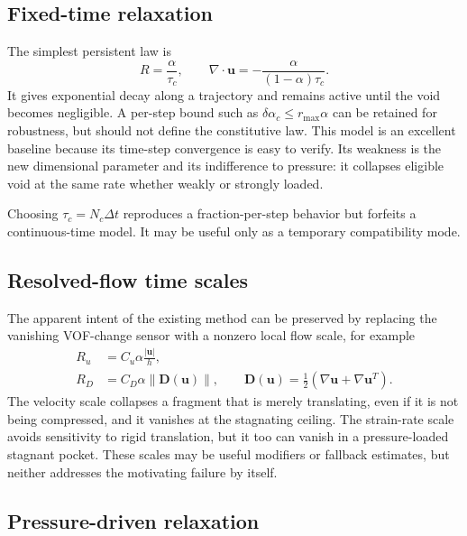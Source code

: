 \documentclass[11pt]{article}
\newcommand{\Dt}{\Delta t}
\newcommand{\divg}{\nabla\!\cdot}
\newcommand{\uv}{\boldsymbol{u}}
\begin{document}
\subsection{Fixed-time relaxation}

The simplest persistent law is
\begin{equation}
  R=\frac{\alpha}{\tau_c}, \qquad
  \divg\uv=-\frac{\alpha}{(1-\alpha)\tau_c}.
  \label{eq:fixed-time}
\end{equation}
It gives exponential decay along a trajectory and remains active until the void becomes
negligible.  A per-step bound such as \(\delta\alpha_c\le r_{\max}\alpha\) can be retained
for robustness, but should not define the constitutive law.  This model is an excellent
baseline because its time-step convergence is easy to verify.  Its weakness is the new
dimensional parameter and its indifference to pressure: it collapses eligible void at the
same rate whether weakly or strongly loaded.

Choosing \(\tau_c=N_c\Dt\) reproduces a fraction-per-step behavior but forfeits a
continuous-time model.  It may be useful only as a temporary compatibility mode.

\subsection{Resolved-flow time scales}

The apparent intent of the existing method can be preserved by replacing the vanishing
VOF-change sensor with a nonzero local flow scale, for example
\begin{align}
  R_u &= C_u\alpha\frac{|\uv|}{h}, \\
  R_D &= C_D\alpha\|\boldsymbol D(\uv)\|,
  \qquad
  \boldsymbol D(\uv)=\tfrac12(\nabla\uv+\nabla\uv^T).
\end{align}
The velocity scale collapses a fragment that is merely translating, even if it is not
being compressed, and it vanishes at the stagnating ceiling.  The strain-rate scale
avoids sensitivity to rigid translation, but it too can vanish in a pressure-loaded
stagnant pocket.  These scales may be useful modifiers or fallback estimates, but neither
addresses the motivating failure by itself.

\subsection{Pressure-driven relaxation}
\end{document}
